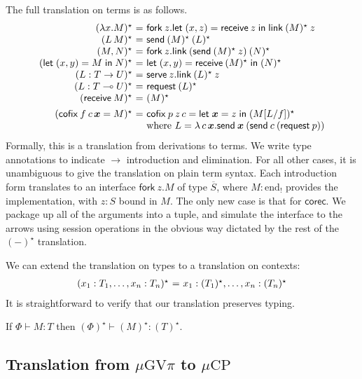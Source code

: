 \documentclass[orivec,envcountsame]{llncs}
\makeatletter
\newcommand{\gvdual}[1]{\overline{#1}}
\newcommand{\lto}{\ensuremath{\multimap}}
\newcommand{\uto}{\ensuremath{\rightarrow}}
\newcommand{\outterm}{\mathrm{end}_!}
\newcommand{\gvtyp}[3]{#1 \vdash #2 : #3}
\newcommand{\mkwd}[1]{\mathsf{#1}}
\newcommand{\gvsend}[2]{\mkwd{send}\:#1\:#2}
\newcommand{\gvreceive}[1]{\mkwd{receive}\:#1}
\newcommand{\gvlet}[3]{\mkwd{let}\;#1 = #2\;\mkwd{in}\;#3}
\newcommand{\gvlink}[2]{\mkwd{link}\:#1\:#2}
\newcommand{\gvfork}[2]{\mkwd{fork}\:#1.#2}
\newcommand{\lrkwd}{\mkwd{cofix}}
\newcommand{\gvfix}[3]{\lrkwd\:#1\:#2 = #3}
\newcommand{\gvserve}[2]{\mkwd{serve}\:#1.#2}
\newcommand{\gvrequest}[1]{\mkwd{request}\:#1}
\newcommand{\key}{\mkwd}
\newcommand{\topi}[1]{({#1})^\star}
\newcommand{\mucp}{$\mu\mathrm{CP}$\xspace}
\newcommand{\gvpi}{$\mu\mathrm{GV}\pi$\xspace}
\newcommand{\ba}{\begin{array}}
\newcommand{\ea}{\end{array}}
\newenvironment{equations}{\[\ba{@{}r@{~}c@{~}l@{}}}{\ea\]}
\makeatother
\begin{document}
The full translation on terms is as follows.
\begin{equations}
\topi{\lambda x.M} &=& \gvfork{z}{\gvlet{(x, z)}{\gvreceive{z}}{\gvlink{\topi{M}}{z}}} \\
\topi{L\,M} &=& \gvsend{\topi{M}}{\topi{L}} \\
\topi{M, N} &=&
  \gvfork{z}
    {\gvlink{(\gvsend{\topi{M}}{z})}{\topi{N}}} \\
\topi{\gvlet{(x, y)}{M}{N}} &=&
    \gvlet{(x, y)}{\gvreceive{\topi{M}}}{\topi{N}} \\
\topi{L : T \uto U} &=&
  \gvserve{z}{\gvlink{\topi{L}}{z}} \\
\topi{L : T \lto U} &=& \gvrequest{\topi{L}} \\
\topi{\gvreceive{M}} &=& \topi{M}
\\[1ex]
\topi{\gvfix{f}{c\,\vec{x}}{M}} &=&
  \gvfix{p}{z\,c}{\gvlet{\vec{x}}{z}{\topi{M[L/f]}}} \\
&& \text{where }L = \lambda\,c\,\vec{x}.\gvsend{\vec{x}}{(\gvsend{c}{(\gvrequest{p})})} \\
\end{equations}%
Formally, this is a translation from derivations to terms. We write type annotations to indicate
$\to$ introduction and elimination. For all other cases, it is unambiguous to give the translation
on plain term syntax. Each introduction form translates to an interface $\gvfork{z}{M}$ of type
$\gvdual{S}$, where $M : \outterm$ provides the implementation, with $z : S$ bound in $M$.
%
The only new case is that for $\key{corec}$. We package up all of the arguments into a tuple, and
simulate the interface to the arrows using session operations in the obvious way dictated by the
rest of the $\topi{-}$ translation.

We can extend the translation on types to a translation on contexts:
\begin{equations}
\topi{x_1:T_1, \dots, x_n:T_n} &=& x_1:\topi{T_1}, \dots, x_n:\topi{T_n} \\
\end{equations}%
It is straightforward to verify that our translation preserves typing.
\begin{theorem}
If $\gvtyp{\Phi}{M}{T}$ then $\gvtyp{\topi{\Phi}}{\topi{M}}{\topi{T}}$.
\end{theorem}

\subsection{Translation from \gvpi to \mucp}\label{sec:gvpitocp}
\end{document}
